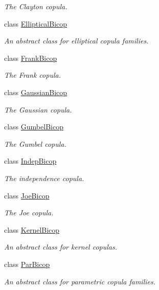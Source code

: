 \begin{DoxyCompactItemize}
\begin{DoxyCompactList}\small\item\em The Clayton copula. \end{DoxyCompactList}\item 
class \hyperlink{classvinecopulib_1_1_elliptical_bicop}{Elliptical\+Bicop}
\begin{DoxyCompactList}\small\item\em An abstract class for elliptical copula families. \end{DoxyCompactList}\item 
class \hyperlink{classvinecopulib_1_1_frank_bicop}{Frank\+Bicop}
\begin{DoxyCompactList}\small\item\em The Frank copula. \end{DoxyCompactList}\item 
class \hyperlink{classvinecopulib_1_1_gaussian_bicop}{Gaussian\+Bicop}
\begin{DoxyCompactList}\small\item\em The Gaussian copula. \end{DoxyCompactList}\item 
class \hyperlink{classvinecopulib_1_1_gumbel_bicop}{Gumbel\+Bicop}
\begin{DoxyCompactList}\small\item\em The Gumbel copula. \end{DoxyCompactList}\item 
class \hyperlink{classvinecopulib_1_1_indep_bicop}{Indep\+Bicop}
\begin{DoxyCompactList}\small\item\em The independence copula. \end{DoxyCompactList}\item 
class \hyperlink{classvinecopulib_1_1_joe_bicop}{Joe\+Bicop}
\begin{DoxyCompactList}\small\item\em The Joe copula. \end{DoxyCompactList}\item 
class \hyperlink{classvinecopulib_1_1_kernel_bicop}{Kernel\+Bicop}
\begin{DoxyCompactList}\small\item\em An abstract class for kernel copulas. \end{DoxyCompactList}\item 
class \hyperlink{classvinecopulib_1_1_par_bicop}{Par\+Bicop}
\begin{DoxyCompactList}\small\item\em An abstract class for parametric copula families. \end{DoxyCompactList}\item 

\end{DoxyCompactItemize}
